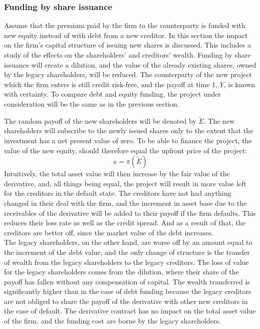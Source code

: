 \documentclass[main.tex]{subfiles}
\begin{document}
    \subsubsection{Funding by share issuance}
    \label{sec:example-equity-issuance}
        Assume that the premium paid by the firm to the counterparty is funded with new equity instead of with debt from a new creditor. 
        In this section the impact on the firm's capital structure of issuing new shares is discussed.
        This includes a study of the effects on the shareholders' and creditors' wealth. 
        Funding by share issuance will create a dilution, and the value of the already existing shares, owned by the legacy shareholders, will be reduced. 
        The counterparty of the new project which the firm enters is still credit risk-free, 
        and the payoff at time 1, $Y$, is known with certainty. 
        To compare debt and equity funding, 
        the project under consideration will be the same as in the previous section.

        The random payoff of the new shareholders will be denoted by $\tilde{E}$.
        The new shareholders will subscribe to the newly issued shares 
        only to the extent that the investment has a net present value of zero.
        To be able to finance the project, the value of the new equity,
        should therefore equal the upfront price of the project:
        \begin{equation}\label{eqn:derivative-zero-npv}
            u = \pi(\tilde{E})
        \end{equation}
        Intuitively, the total asset value will then increase by the fair value of the derivative, and, all things being equal, the project will result in more value left for the creditors in the default state. 
        The creditors have not had anything changed in their deal with the firm, and the increment in asset base due to the receivables of the derivative will be added to their payoff if the firm defaults. 
        This reduces their loss rate as well as the credit spread.
        And as a result of that, the creditors are better off, since the market value of the debt increases.\\
        The legacy shareholders, on the other hand, are worse off by an amount equal to the increment of the debt value, and the only change of structure is the transfer of wealth from the legacy shareholders to the legacy creditors. 
        The loss of value for the legacy shareholders comes from the dilution, where their share of the payoff has fallen without any compensation of capital. 
        The wealth transferred is significantly higher than in the case of debt funding because the legacy creditors are not obliged to share the payoff of the derivative with other new creditors in the case of default. 
        The derivative contract has no impact on the total asset value of the firm, and the funding cost are borne by the legacy shareholders.
\end{document}
